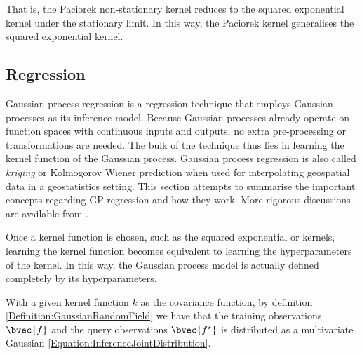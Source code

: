 				That is, the Paciorek non-stationary kernel reduces to the squared exponential kernel under the stationary limit. In this way, the Paciorek kernel generalises the squared exponential kernel.
				
				\FloatBarrier
			
		\subsection{Regression}
		\label{Background:GaussianProcesses:Regression}
		
			Gaussian process regression is a regression technique that employs Gaussian processes as its inference model. Because Gaussian processes already operate on function spaces with continuous inputs and outputs, no extra pre-processing or transformations are needed. The bulk of the technique thus lies in learning the kernel function of the Gaussian process. Gaussian process regression is also called \textit{kriging} or Kolmogorov Wiener prediction when used for interpolating geospatial data in a geostatistics setting. This section attempts to summarise the important concepts regarding GP regression and how they work. More rigorous discussions are available from \cite{GaussianProcessForMachineLearning}. 
			
			Once a kernel function is chosen, such as the squared exponential or \matern kernels, learning the kernel function becomes equivalent to learning the hyperparameters of the kernel. In this way, the Gaussian process model is actually defined completely by its hyperparameters. %
			
			With a given kernel function $k$ as the covariance function, by definition \ref{Definition:GaussianRandomField} we have that the training observations $\bvec{f}$ and the query observations $\bvec{f^{\star}}$ is distributed as a multivariate Gaussian \eqref{Equation:InferenceJointDistribution}.
			
